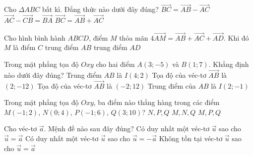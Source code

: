 \begin{ex}%
	Cho $\Delta ABC$ bất kì. Đẳng thức nào dưới đây đúng?
	{$\vec{BC}=\vec{AB}-\vec{AC}$}
	{$\vec{AC}-\vec{CB}=\vec{BA}$}
	{$\vec{BC}=\vec{AB}+\vec{AC}$}
\end{ex}

\begin{ex}%
	Cho hình bình hành $ABCD$, điểm $M$ thỏa mãn $4\vec{AM}=\vec{AB}+\vec{AC}+\vec{AD}$. Khi đó $M$ là
	{điểm $C$}
	{trung điểm $AB$}
	{trung điểm $AD$}
\end{ex}

\begin{ex}%
	Trong mặt phẳng tọa độ $Oxy$ cho hai điểm $A(3;-5)$ và $B(1;7)$. Khẳng định nào dưới đây đúng?
	\choice
	{Trung điểm $AB$ là $I(4;2)$}
	{Tọa độ của véc-tơ $\vec{AB}$ là $(2;-12)$}
	{\True Tọa độ của véc-tơ $\vec{AB}$ là $(-2;12)$}
	{Trung điểm của $AB$ là $I(2;-1)$}
\end{ex}

\begin{ex}%
	Trong mặt phẳng tọa độ $Oxy$, ba điểm nào thẳng hàng trong các điểm  $M(-1;2)$, $N(0;4)$, $P(-1;6)$, $Q(3;10)$?
	{$N,P,Q$}
	{\True $M,N,Q$}
	{$M,P,Q$}
\end{ex}


\begin{ex} %
	Cho véc-tơ $\vec{a}$. Mệnh đề nào sau đây đúng?
	{Có duy nhất một véc-tơ $\vec{u}$ sao cho $\vec{u}=\vec{a}$}
	{Có duy nhất một véc-tơ $\vec{u}$ sao cho $\vec{u}=-\vec{a}$}
	{Không tồn tại véc-tơ $\vec{u}$ sao cho $\vec{u}=\vec{a}$}
\end{ex}

